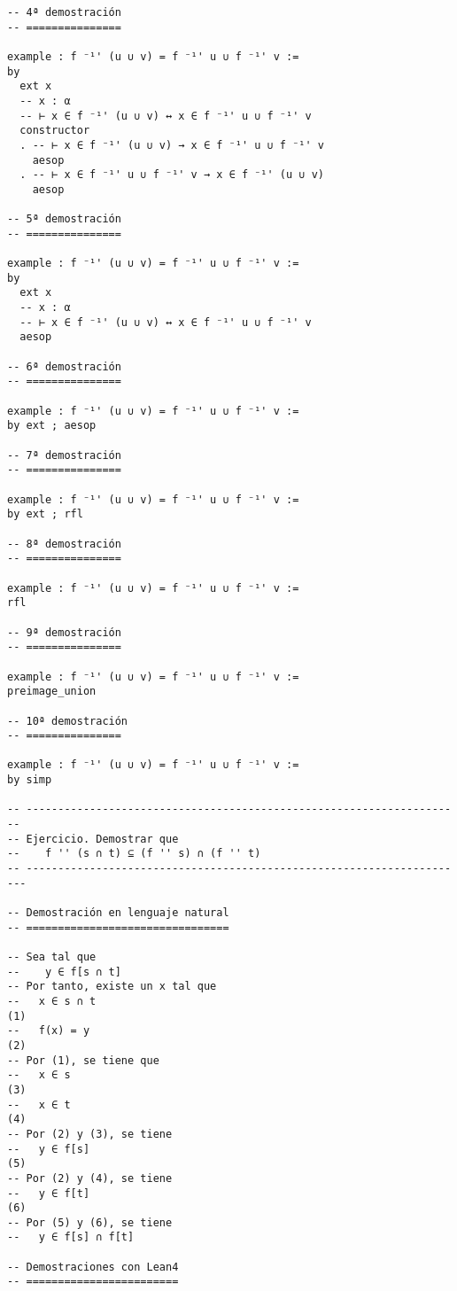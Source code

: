 \begin{verbatim}
-- 4ª demostración
-- ===============

example : f ⁻¹' (u ∪ v) = f ⁻¹' u ∪ f ⁻¹' v :=
by
  ext x
  -- x : α
  -- ⊢ x ∈ f ⁻¹' (u ∪ v) ↔ x ∈ f ⁻¹' u ∪ f ⁻¹' v
  constructor
  . -- ⊢ x ∈ f ⁻¹' (u ∪ v) → x ∈ f ⁻¹' u ∪ f ⁻¹' v
    aesop
  . -- ⊢ x ∈ f ⁻¹' u ∪ f ⁻¹' v → x ∈ f ⁻¹' (u ∪ v)
    aesop

-- 5ª demostración
-- ===============

example : f ⁻¹' (u ∪ v) = f ⁻¹' u ∪ f ⁻¹' v :=
by
  ext x
  -- x : α
  -- ⊢ x ∈ f ⁻¹' (u ∪ v) ↔ x ∈ f ⁻¹' u ∪ f ⁻¹' v
  aesop

-- 6ª demostración
-- ===============

example : f ⁻¹' (u ∪ v) = f ⁻¹' u ∪ f ⁻¹' v :=
by ext ; aesop

-- 7ª demostración
-- ===============

example : f ⁻¹' (u ∪ v) = f ⁻¹' u ∪ f ⁻¹' v :=
by ext ; rfl

-- 8ª demostración
-- ===============

example : f ⁻¹' (u ∪ v) = f ⁻¹' u ∪ f ⁻¹' v :=
rfl

-- 9ª demostración
-- ===============

example : f ⁻¹' (u ∪ v) = f ⁻¹' u ∪ f ⁻¹' v :=
preimage_union

-- 10ª demostración
-- ===============

example : f ⁻¹' (u ∪ v) = f ⁻¹' u ∪ f ⁻¹' v :=
by simp

-- ---------------------------------------------------------------------
-- Ejercicio. Demostrar que
--    f '' (s ∩ t) ⊆ (f '' s) ∩ (f '' t)
-- ----------------------------------------------------------------------

-- Demostración en lenguaje natural
-- ================================

-- Sea tal que
--    y ∈ f[s ∩ t]
-- Por tanto, existe un x tal que
--   x ∈ s ∩ t                                                       (1)
--   f(x) = y                                                        (2)
-- Por (1), se tiene que
--   x ∈ s                                                           (3)
--   x ∈ t                                                           (4)
-- Por (2) y (3), se tiene
--   y ∈ f[s]                                                        (5)
-- Por (2) y (4), se tiene
--   y ∈ f[t]                                                        (6)
-- Por (5) y (6), se tiene
--   y ∈ f[s] ∩ f[t]

-- Demostraciones con Lean4
-- ========================


\end{verbatim}

